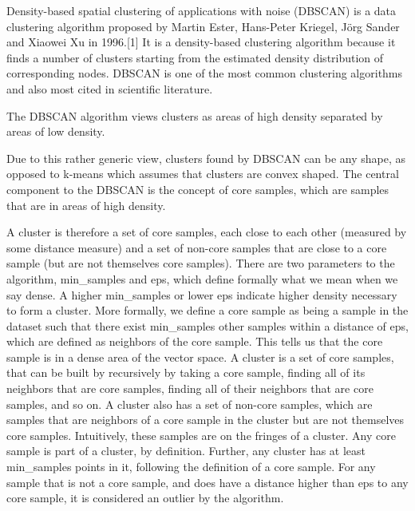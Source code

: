 Density-based spatial clustering of applications with noise (DBSCAN) is a data clustering algorithm proposed by Martin Ester, Hans-Peter Kriegel, Jörg Sander and Xiaowei Xu in 1996.[1] It is a density-based clustering algorithm because it finds a number of clusters starting from the estimated density distribution of corresponding nodes. DBSCAN is one of the most common clustering algorithms and also most cited in scientific literature.


The DBSCAN algorithm views clusters as areas of high density separated by areas of low density. 

Due to this rather generic view, clusters found by DBSCAN can be any shape, as opposed to k-means which assumes that clusters are convex shaped. 
The central component to the DBSCAN is the concept of core samples, which are samples that are in areas of high density. 

A cluster is therefore a set of core samples, each close to each other (measured by some distance measure) and a set of non-core samples that are close to a core sample (but are not themselves core samples). There are two parameters to the algorithm, min_samples and eps, which define formally what we mean when we say dense. A higher min_samples or lower eps indicate higher density necessary to form a cluster.
More formally, we define a core sample as being a sample in the dataset such that there exist min_samples other samples within a distance of eps, which are defined as neighbors of the core sample. This tells us that the core sample is in a dense area of the vector space. A cluster is a set of core samples, that can be built by recursively by taking a core sample, finding all of its neighbors that are core samples, finding all of their neighbors that are core samples, and so on. A cluster also has a set of non-core samples, which are samples that are neighbors of a core sample in the cluster but are not themselves core samples. Intuitively, these samples are on the fringes of a cluster.
Any core sample is part of a cluster, by definition. Further, any cluster has at least min_samples points in it, following the definition of a core sample. For any sample that is not a core sample, and does have a distance higher than eps to any core sample, it is considered an outlier by the algorithm.

